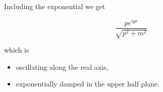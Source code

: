 \documentclass{beamer}
\newcommand{\integrand}{\frac{p e^{ipr}}{\sqrt{p^2 + m^2}}}
\begin{document}

\begin{frame}
Including the exponential we get

$$\integrand$$

which is

\begin{itemize}
\pause
\item \alert{oscillating} along the real axis,

\pause
\item \alert{exponentially damped} in the upper half plane.
\end{itemize}
\end{frame}





\end{document}

